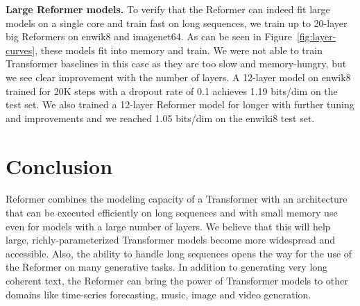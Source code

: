 \textbf{Large Reformer models.} \label{sec:exp_large}
To verify that the Reformer can indeed fit large models on a single core and train fast on long sequences, we train up to 20-layer big Reformers on enwik8 and imagenet64. As can be seen in Figure~\ref{fig:layer-curves}, these models fit into memory and train. We were not able to train Transformer baselines in this case as they are too slow and memory-hungry, but we see clear improvement with the number of layers. A 12-layer model on enwik8 trained for 20K steps with a dropout rate of 0.1 achieves 1.19 bits/dim on the test set. We also trained a 12-layer Reformer model for longer with further tuning and improvements and we reached 1.05 bits/dim on the enwiki8 test set.

\section{Conclusion}

Reformer combines the modeling capacity of a Transformer with an architecture that can be executed efficiently on long sequences and with small memory use even for models with a large number of layers. We believe that this will help large, richly-parameterized Transformer models become more widespread and accessible. Also, the ability to handle long sequences opens the way for the use of the Reformer on many generative tasks. In addition to generating very long coherent text, the Reformer can bring the power of Transformer models to other domains like time-series forecasting, music, image and video generation.


